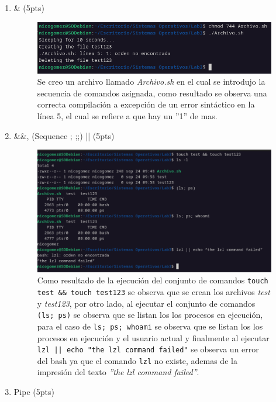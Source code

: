 \documentclass{templateNote}
\begin{document}
\begin{enumerate}
    \item \& (5pts)
    \begin{figure}[H]
        \centering
        \includegraphics[width=\textwidth]{img/ejerc1.png}
        Se creo un archivo llamado \textit{Archivo.sh} en el cual se introdujo la secuencia de comandos asignada, como resultado se observa una correcta compilación a excepción de un error sintáctico en la línea 5, el cual se refiere a que hay un ''1'' de mas.
    \end{figure}
    \newpage
    \item \&\&, (Sequence ; ;;) || (5pts)
    \begin{figure}[H]
        \centering
        \includegraphics[width=\textwidth]{img/ejerc2.png}
        Como resultado de la ejecución del conjunto de comandos \texttt{touch test \&\& touch test123} se observa que se crean los archivos \textit{test} y \textit{test123}, por otro lado, al ejecutar el conjunto de comandos \texttt{(ls; ps)} se observa que se listan los los procesos en ejecución, para el caso de \texttt{ls; ps; whoami} se observa que se listan los los procesos en ejecución y el usuario actual y finalmente al ejecutar \texttt{lzl || echo "the lzl command failed"} se observa un error del bash ya que el comando \texttt{lzl} no existe, ademas de la impresión del texto \textit{''the lzl command failed''}.
    \end{figure}
    \item Pipe (5pts)
    \begin{figure}[H]

\end{figure}
\end{enumerate}
\end{document}
